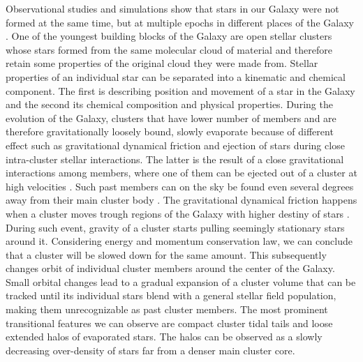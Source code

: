 Observational studies and simulations show that stars in our Galaxy were not formed at the same time, but at multiple epochs in different places of the Galaxy \citep{2001ApJ...554.1044C, 2017ARA&A..55...59N}. One of the youngest building blocks of the Galaxy are open stellar clusters whose stars formed from the same molecular cloud of material \citep{2003ARA&A..41...57L} and therefore retain some properties of the original cloud they were made from. Stellar properties of an individual star can be separated into a kinematic and chemical component. The first is describing position and movement of a star in the Galaxy and the second its chemical composition and physical properties. During the evolution of the Galaxy, clusters that have lower number of members and are therefore gravitationally loosely bound, slowly evaporate because of different effect such as gravitational dynamical friction and ejection of stars during close intra-cluster stellar interactions. The latter is the result of a close gravitational interactions among members, where one of them can be ejected out of a cluster at high velocities \citep{2009MNRAS.396..570G, 2010MNRAS.402..105G, 2017MNRAS.470.3049R}. Such past members can on the sky be found even several degrees away from their main cluster body \citep{2007MNRAS.376L..29G, 2018MNRAS.473.4612K, 2019ApJ...884....6M}. The gravitational dynamical friction happens when a cluster moves trough regions of the Galaxy with higher destiny of stars \citep{2010MNRAS.401.2753B}. During such event, gravity of a cluster starts pulling seemingly stationary stars around it. Considering energy and momentum conservation law, we can conclude that a cluster will be slowed down for the same amount. This subsequently changes orbit of individual cluster members around the center of the Galaxy. Small orbital changes lead to a gradual expansion of a cluster volume that can be tracked until its individual stars blend with a general stellar field population, making them unrecognizable as past cluster members. The most prominent transitional features we can observe are compact cluster tidal tails \citep{2019AA...627A...4R, 2019AJ....157..115Y, 2019AA...621L...3M, 2019arXiv191206657Z} and loose extended halos of evaporated stars. The halos can be observed as a slowly decreasing over-density \citep{2002A&A...385..471C, 2004A&A...427..485B, 2019AA...627A.119C} of stars far from a denser main cluster core.

